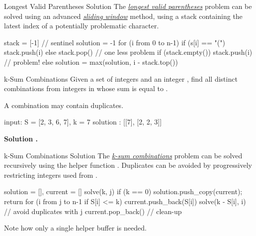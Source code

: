 \documentclass{cognito}
\begin{document}
\begin{note}{Longest Valid Parentheses Solution}
	The \hyperref[note:Longest Valid Parentheses]{\it longest valid parentheses} problem can be solved using
	an advanced \hyperref[note:Sliding Window Method]{\it sliding window} method, using a stack
	containing the latest index of a potentially problematic character.
	
	\begin{largecode}
 stack = [-1]  // sentinel
 solution = -1
 for (i from 0 to n-1)
 	if (s[i] == "(") stack.push(i)
	else
		stack.pop()   // one less problem
		if (stack.empty()) stack.push(i) // problem!
		else solution = max(solution, i - stack.top())
	\end{largecode}
\end{note}

\begin{note}{k-Sum Combinations}
	Given a set of integers  and an integer ,
	find all distinct combinations from integers in  whose sum is equal to .
	\begin{remark} A combination may contain duplicates. \end{remark}
	\begin{largecode}
 input: S = [2, 3, 6, 7], k = 7
 solution : [[7], [2, 2, 3]]
	\end{largecode}
	\bf Solution \hyperref[note:k-Sum Combinations Solution]{\solutionref}.
\end{note}

\begin{note}{k-Sum Combinations Solution}
	The \hyperref[note:k-Sum Combinations]{\it k-sum combinations} problem can be solved recursively
	using the helper function .
	Duplicates can be avoided by progressively restricting integers used from .
	
	\begin{largecode}
 solution = [], current = []
 solve(k, j)
 	if (k == 0) { solution.push_copy(current); return }
	for (i from j to n-1 if S[i] <= k)
		current.push_back(S[i])
		solve(k - S[i], i)   // avoid duplicates with j
		current.pop_back()   // clean-up
	\end{largecode}
	\begin{remark} Note how only a single helper buffer  is needed. \end{remark}
	\vspace{-5pt}
\end{note}
\end{document}
